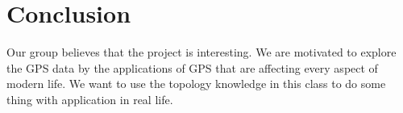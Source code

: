 \documentclass[11pt]{article}
\begin{document}
\section*{Conclusion}
Our group believes that the project is interesting. We are motivated to explore the GPS data by the applications of GPS that are affecting every aspect of modern life. We want to use the topology knowledge in this class to do some thing with application in real life.
\end{document}
